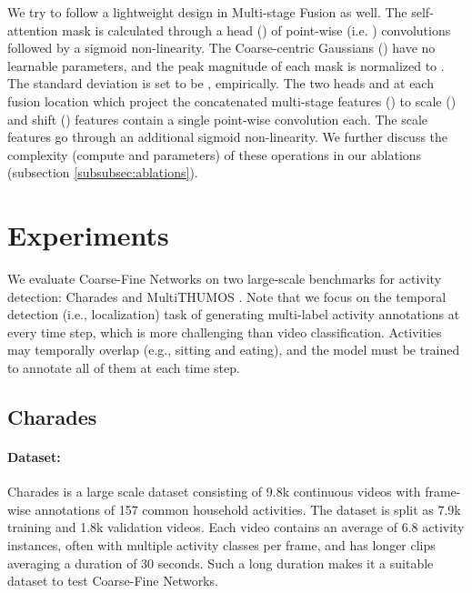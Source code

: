 \documentclass[final]{cvpr}
\begin{document}
We try to follow a lightweight design in Multi-stage Fusion as well. The self-attention mask  is calculated through a head () of  point-wise (i.e. ) convolutions followed by a sigmoid non-linearity. The Coarse-centric Gaussians () have no learnable parameters, and the peak magnitude of each mask is normalized to . The standard deviation  is set to be , empirically. The two heads  and  at each fusion location which project the concatenated multi-stage features () to scale () and shift () features contain a single point-wise convolution each. The scale features go through an additional sigmoid non-linearity. We further discuss the complexity (compute and parameters) of these operations in our ablations (subsection \ref{subsubsec:ablations}).

\vspace{-2mm}

\section{Experiments}
\vspace{-1mm}

We evaluate Coarse-Fine Networks on two large-scale benchmarks for activity detection: Charades \cite{sigurdsson2016hollywood} and MultiTHUMOS \cite{yeung2018every}. Note that we focus on the temporal detection (i.e., localization) task of generating multi-label activity annotations at every time step, which is more challenging than video classification. Activities may temporally overlap (e.g., sitting and eating), and the model must be trained to annotate all of them at each time step.









\vspace{-1mm}
\subsection{Charades}
\label{subsec:charades}
\vspace{-1mm}

\paragraph{Dataset:} Charades \cite{sigurdsson2016hollywood} is a large scale dataset consisting of 9.8k continuous videos with frame-wise annotations of 157 common household activities. The dataset is split as 7.9k training and 1.8k validation videos. Each video contains an average of 6.8 activity instances, often with multiple activity classes per frame, and has longer clips averaging a duration of 30 seconds. Such a long duration makes it a suitable dataset to test Coarse-Fine Networks.
\end{document}
